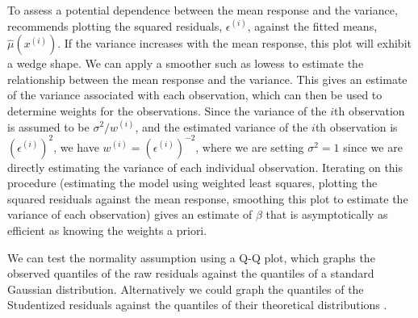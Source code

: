 \documentclass[12pt]{article}
\begin{document}
To assess a potential dependence between the mean response and the variance, \cite[\S~10.4.2]{Seber:2003} recommends plotting the squared residuals, $\epsilon^{(i)}$, against the fitted means, $\hat{\mu}(x^{(i)})$. If the variance increases with the mean response, this plot will exhibit a wedge shape. We can apply a smoother such as lowess to estimate the relationship between the mean response and the variance. This gives an estimate of the variance associated with each observation, which can then be used to determine weights for the observations. Since the variance of the $i$th observation is assumed to be $\sigma^2 / w^{(i)}$, and the estimated variance of the $i$th observation is $(\epsilon^{(i)})^2$, we have $w^{(i)} = (\epsilon^{(i)})^{-2}$, where we are setting $\sigma^2=1$ since we are directly estimating the variance of each individual observation.  Iterating on this procedure (estimating the model using weighted least squares, plotting the squared residuals against the mean response, smoothing this plot to estimate the variance of each observation) gives an estimate of $\beta$ that is asymptotically as efficient as knowing the weights a priori.

We can test the normality assumption using a Q-Q plot, which graphs the observed quantiles of the raw residuals against the quantiles of a standard Gaussian distribution. Alternatively we could graph the quantiles of the Studentized residuals against the quantiles of their theoretical distributions \cite[\S~10.5.1]{Seber:2003}.
\end{document}
